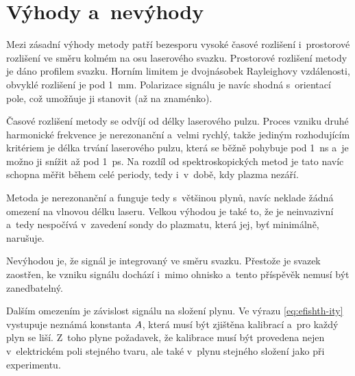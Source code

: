 \section{Výhody a~nevýhody}
\label{sec:efishth-proscons}
Mezi zásadní výhody metody \EFISH{} patří bezesporu vysoké časové
rozlišení i~prostorové rozlišení ve směru kolmém na osu laserového svazku.
Prostorové rozlišení metody je dáno profilem svazku.
Horním limitem je dvojnásobek Rayleighovy vzdálenosti,
obvyklé rozlišení je pod \SI{1}{\milli\metre}.
Polarizace signálu je navíc shodná s~orientací pole,
což umožňuje ji stanovit (až na znaménko).

Časové rozlišení metody se odvíjí od délky laserového pulzu.
Proces vzniku druhé harmonické frekvence je nerezonanční a~velmi rychlý,
takže jediným rozhodujícím kritériem je délka trvání laserového pulzu,
která se běžně pohybuje pod \SI{1}{\nano\second} a~je možno ji snížit
až pod \SI{1}{\pico\second}.
\autocite{efish-lecture}
Na rozdíl od spektroskopických metod je tato navíc schopna měřit
během celé periody, tedy i~v~době, kdy plazma nezáří.

Metoda je nerezonanční a funguje tedy s~většinou plynů,
navíc neklade žádná omezení na vlnovou délku laseru.
Velkou výhodou je také to, že je neinvazivní a~tedy nespočívá
v~zavedení sondy do plazmatu, která jej, byť minimálně, narušuje.

Nevýhodou \EFISH{} je, že signál je integrovaný ve směru svazku.
Přestože je svazek zaostřen, ke vzniku signálu dochází i~mimo ohnisko
a~tento příspěvěk nemusí být zanedbatelný.
\autocite{efish-lecture}

Dalším omezením je závislost signálu na složení plynu.
Ve výrazu \eqref{eq:efishth-ity} vystupuje neznámá konstanta $A$,
která musí být zjištěna kalibrací a~pro každý plyn se liší.
Z~toho plyne požadavek, že kalibrace musí být provedena nejen v~elektrickém
poli stejného tvaru, ale také v~plynu stejného složení jako při experimentu.
\autocite{efish-lecture}
